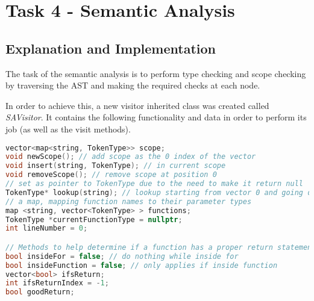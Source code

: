 \section{Task 4 - Semantic Analysis}
\subsection{Explanation and Implementation}
The task of the semantic analysis is to perform type checking and scope checking by traversing the AST and making the required checks at each node.

In order to achieve this, a new visitor inherited class was created called \textit{SAVisitor}. It contains the following functionality and data in order to perform its job (as well as the visit methods).

\begin{lstlisting}[language=C++]
 vector<map<string, TokenType>> scope;
void newScope(); // add scope as the 0 index of the vector
void insert(string, TokenType); // in current scope
void removeScope(); // remove scope at position 0
// set as pointer to TokenType due to the need to make it return null
TokenType* lookup(string); // lookup starting from vector 0 and going down
// a map, mapping function names to their parameter types
map <string, vector<TokenType> > functions; 
TokenType *currentFunctionType = nullptr;
int lineNumber = 0;

// Methods to help determine if a function has a proper return statement in all paths
bool insideFor = false; // do nothing while inside for
bool insideFunction = false; // only applies if inside function
vector<bool> ifsReturn;
int ifsReturnIndex = -1;
bool goodReturn;
\end{lstlisting}

